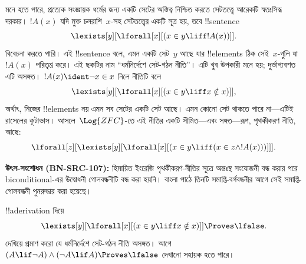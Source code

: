 \documentclass[../../../include/open-logic-section]{subfiles}
\begin{document}
মনে হতে পারে, প্রত্যেক সংজ্ঞায়ক ধর্মের জন্য একটি সেটের অস্তিত্ব নিশ্চিত
করতে সেটতত্ত্বে আরেকটি স্বতঃসিদ্ধ দরকার। $!A(x)$ যদি মুক্ত
চলরাশি~$x$-সহ সেটতত্ত্বের একটি সূত্র হয়, তবে
!!{sentence}
\[
\lexists[y][\lforall[x][(x \in y \liff !A(x))]].
\]
বিবেচনা করতে পারি। এই !!{sentence} বলে, এমন একটি সেট~$y$ আছে যার
!!{element}s ঠিক সেই~$x$-গুলি যা~$!A(x)$ পরিতৃপ্ত করে। এই ছকটির নাম
“ধর্মনির্দেশে সেট-গঠন নীতি”। এটি খুব উপকারী মনে হয়; দুর্ভাগ্যবশত এটি
অসঙ্গত। $!A(x) \ident \lnot x \in x$ নিলে নীতিটি বলে
\[
\lexists[y][\lforall[x][(x \in y \liff x \notin x)]],
\]
অর্থাৎ, নিজের !!{element}s নয় এমন সব সেটের একটি সেট আছে। এমন কোনো সেট
থাকতে পারে না—এটিই রাসেলের কূটাভাস। আসলে~$\Log{ZFC}$-তে এই নীতির একটি
সীমিত—এবং সঙ্গত—রূপ, পৃথকীকরণ নীতি, আছে:
\[
\lforall[z][\lexists[y][\lforall[x][(x \in y \liff (x \in z \land
      !A(x)))]]].
\]
\par\smallskip\noindent\textnormal{\small\textbf{উৎস-সংশোধন (BN-SRC-107):} হিমায়িত ইংরেজি পৃথকীকরণ-নীতির সূত্রে অন্তঃস্থ সংযোজনী বন্ধ করার পরে biconditional-এর উদ্বোধনী গোলবন্ধনীটি বন্ধ করা হয়নি। বাংলা পাঠে তিনটি সমাপ্তি-বর্গবন্ধনীর আগে সেই সমাপ্তি-গোলবন্ধনী পুনরুদ্ধার করা হয়েছে।} %

\begin{prob}
!!a{derivation} দিয়ে
\[
\lexists[y][\lforall[x][(x \in y \liff x \notin x)]] \Proves \lfalse.
\]
দেখিয়ে প্রমাণ করো যে ধর্মনির্দেশে সেট-গঠন নীতি অসঙ্গত।
আগে $(A \lif \lnot A) \land (\lnot A \lif A)
\Proves \lfalse$ দেখানো সহায়ক হতে পারে।
\end{prob}
\end{document}
